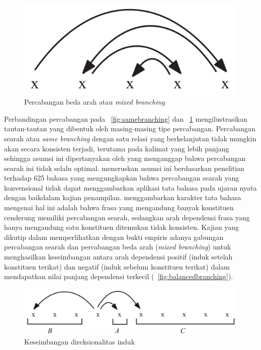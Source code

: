 \begin{figure}
	\centering \includegraphics[width=0.5
	\textwidth] {pics/mixedbranching.png} \caption{Percabangan beda arah atau \textit{mixed branching}} 
\label{fig:mixedbranching} \end{figure}

Perbandingan percabangan pada \pic~\ref{fig:samebranching} dan \pic~\ref{fig:mixedbranching} mengilustrasikan tautan-tautan yang dibentuk oleh masing-masing tipe percabangan. Percabangan searah atau \textit{same branching} dengan satu relasi yang berkelanjutan tidak mungkin akan secara konsisten terjadi, terutama pada kalimat yang lebih panjang sehingga asumsi ini dipertanyakan oleh \cite{temperley2008dependency} yang menganggap bahwa percabangan searah ini tidak selalu optimal. \cite{temperley2008dependency} meneruskan asumsi ini berdasarkan penelitian \cite{dryer1992greenbergian} terhadap 625 bahasa yang mengungkapkan bahwa percabangan searah yang konvensional tidak dapat menggambarkan aplikasi tata bahasa pada ujaran nyata dengan baikdalam kajian penampilan. \cite{dryer1992greenbergian} menggambarkan karakter tata bahasa mengenai hal ini adalah bahwa frasa yang mengandung banyak konstituen cenderung memiliki percabangan searah, sedangkan arah dependensi frasa yang hanya mengandung satu konstituen ditemukan tidak konsisten. Kajian \cite{dryer1992greenbergian} yang dikutip dalam \cite{gildea2010grammars} memperlihatkan dengan bukti empiris adanya gabungan percabangan searah dan percabangan beda arah (\textit{mixed branching}) untuk menghasilkan keseimbangan antara arah dependensi positif (induk setelah konstituen terikat) dan negatif (induk sebelum konstituen terikat) dalam mendapatkan nilai panjang dependensi terkecil (\pic~\ref{fig:balancedbranching}).

\begin{figure}
	\centering \includegraphics[width=0.8
	\textwidth] {pics/balancedbranching.png} \caption{Keseimbangan direksionalitas induk} 
\label{fig:balanceddbranching} \end{figure}

